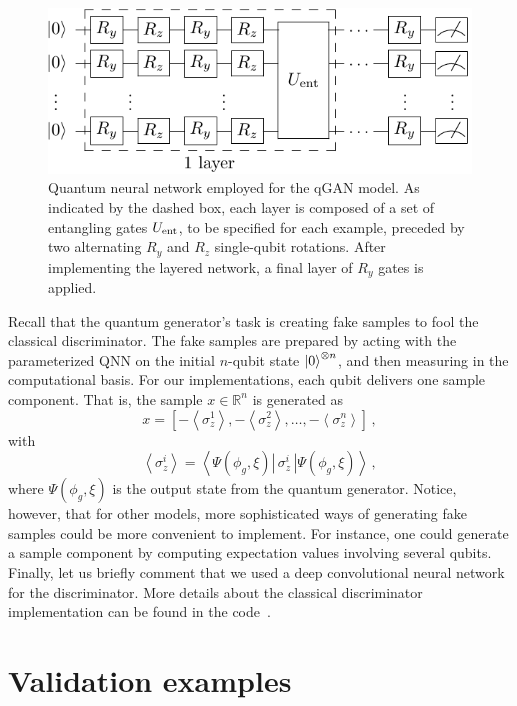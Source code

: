 \documentclass[twocolumn,preprintnumbers,superscriptaddress]{revtex4-2}
\begin{document}
\begin{figure}
  \includegraphics[width=1.0\columnwidth]{plots/ansatz1.pdf}
  \caption{\label{fig:circuit}Quantum neural network employed for the qGAN model. As indicated by the dashed box, each layer is composed of a set of entangling gates $U_{\rm ent}$, to be specified for each example, preceded by two alternating $R_y$ and $R_z$ single-qubit rotations. After implementing the layered network, a final layer of $R_y$ gates is applied.}
\end{figure}

Recall that the quantum generator's task is creating fake samples to fool the classical discriminator. The fake samples are prepared by acting with the parameterized QNN on the initial $n$-qubit state $\ket{0}^{\otimes n}$, and then measuring in the computational basis. For our implementations, each qubit delivers one sample component. That is, the sample $x \in \mathbb{R}^n$ is generated as
\begin{equation}
    \label{eq:samples} x = \left[-\left\langle\sigma_z^1\right\rangle,-\left\langle\sigma_z^2\right\rangle,\hdots,-\left\langle\sigma_z^n\right\rangle\right]\,,
\end{equation}
with
\begin{equation}
    \label{eq:expectation}\left\langle\sigma_z^i\right\rangle = \left\langle\Psi(\phi_g,\xi)\left|\,\sigma_z^i\,\right|\Psi(\phi_g,\xi)\right\rangle \,,
\end{equation}
where $\Psi(\phi_g,\xi)$ is the output state from the quantum generator. Notice, however, that for other models, more sophisticated ways of generating fake samples could be more convenient to implement. For instance, one could generate a sample component by computing expectation values involving several qubits. Finally, let us briefly comment that we used a deep convolutional neural network for the discriminator. More details about the classical discriminator implementation can be found in the code~\cite{cite_code}.

\section{Validation examples}
\label{sec:validation}
\end{document}
